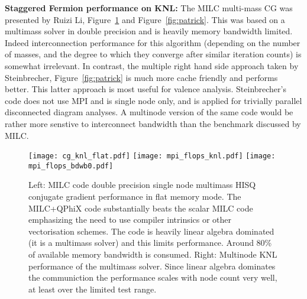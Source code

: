 \documentclass{PoS}
\begin{document}
{\bf Staggered Fermion performance on KNL:}
The MILC multi-mass CG was presented by Ruizi Li, Figure~\ref{fig:milc} and Figure~\ref{fig:patrick}.
This was based on a multimass solver in double precision and is heavily memory bandwidth limited. Indeed
interconnection performance for this algorithm (depending on the number of masses, and the degree to which
they converge after similar iteration counts) is somewhat irrelevant. In contrast, the multiple
right hand side approach taken by Steinbrecher, Figure~\ref{fig:patrick} is much more cache friendly and
performs better. This latter approach is most useful for valence analysis. Steinbrecher's code 
does not use MPI and is single node only, and is applied for trivially parallel disconnected diagram analyses.
A multinode version of the same code would be rather more senstive to interconnect bandwidth than the benchmark
discussed by MILC.

\begin{figure}[hbt]
\texttt{[image: cg\_knl\_flat.pdf]}
\texttt{[image: mpi\_flops\_knl.pdf]}
\texttt{[image: mpi\_flops\_bdwb0.pdf]}
\caption{\label{fig:milc}Left:
MILC code double precision single node multimass HISQ conjugate gradient performance in flat memory mode. The MILC+QPhiX code
substantially beats the scalar MILC code emphasizing the need to use compiler intrinsics or other vectorisation
schemes. The code is heavily linear algebra dominated (it is a multimass solver) and this limits performance. Around 80\% of
available memory bandwidth is consumed.
Right: Multinode KNL performance of the multimass solver. Since linear algebra dominates the communiction
the performance scales with node count very well, at least over the limited test range.
}
\end{figure}
\end{document}
